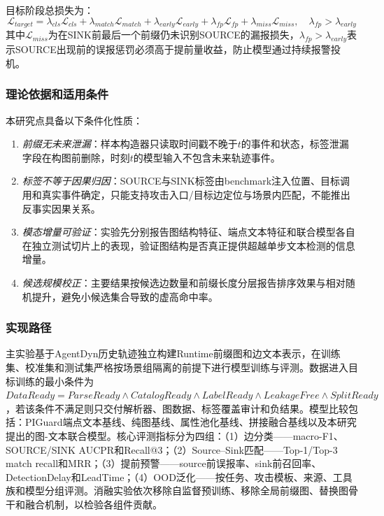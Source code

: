 目标阶段总损失为：
\begin{equation}
  \mathcal{L}_{target} = \lambda_{cls}\mathcal{L}_{cls} + \lambda_{match}\mathcal{L}_{match} + \lambda_{early}\mathcal{L}_{early} + \lambda_{fp}\mathcal{L}_{fp} + \lambda_{miss}\mathcal{L}_{miss},\quad \lambda_{fp} > \lambda_{early}
  \label{eq:total_loss}
\end{equation}
其中$\mathcal{L}_{miss}$为在SINK前最后一个前缀仍未识别SOURCE的漏报损失，$\lambda_{fp} > \lambda_{early}$表示SOURCE出现前的误报惩罚必须高于提前量收益，防止模型通过持续报警投机。

\subsubsection{理论依据和适用条件}

本研究点具备以下条件化性质：
\begin{enumerate}
  \item \emph{前缀无未来泄漏}：样本构造器只读取时间戳不晚于$t$的事件和状态，标签泄漏字段在构图前删除，时刻$t$的模型输入不包含未来轨迹事件。
  \item \emph{标签不等于因果归因}：SOURCE与SINK标签由benchmark注入位置、目标调用和真实事件确定，只能支持攻击入口/目标边定位与场景内匹配，不能推出反事实因果关系。
  \item \emph{模态增量可验证}：实验先分别报告图结构特征、端点文本特征和联合模型各自在独立测试切片上的表现，验证图结构是否真正提供超越单步文本检测的信息增量。
  \item \emph{候选规模校正}：主要结果按候选边数量和前缀长度分层报告排序效果与相对随机提升，避免小候选集合导致的虚高命中率。
\end{enumerate}

\subsubsection{实现路径}

主实验基于AgentDyn历史轨迹独立构建Runtime前缀图和边文本表示，在训练集、校准集和测试集严格按场景组隔离的前提下进行模型训练与评测。数据进入目标训练的最小条件为$DataReady = ParseReady \land CatalogReady \land LabelReady \land LeakageFree \land SplitReady$，若该条件不满足则只交付解析器、图数据、标签覆盖审计和负结果。模型比较包括：PIGuard端点文本基线、纯图基线、属性池化基线、拼接融合基线以及本研究提出的图-文本联合模型。核心评测指标分为四组：（1）边分类——macro-F1、SOURCE/SINK AUCPR和Recall@3；（2）Source--Sink匹配——Top-1/Top-3 match recall和MRR；（3）提前预警——source前误报率、sink前召回率、DetectionDelay和LeadTime；（4）OOD泛化——按任务、攻击模板、来源、工具族和模型分组评测。消融实验依次移除自监督预训练、移除全局前缀图、替换图骨干和融合机制，以检验各组件贡献。

